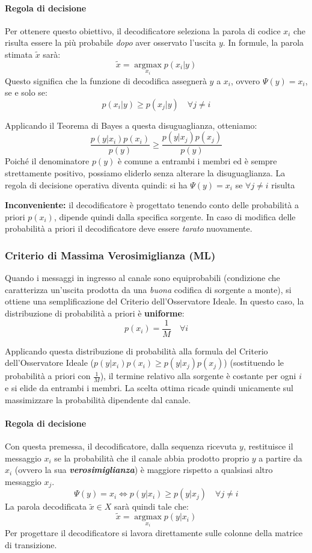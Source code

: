 \paragraph{Regola di decisione}
Per ottenere questo obiettivo, il decodificatore seleziona la parola di codice $x_i$ che risulta essere la più probabile \textit{dopo} aver osservato l'uscita $y$. In formule, la parola stimata $\tilde{x}$ sarà:
\[ \tilde{x} = \operatorname*{argmax}_{x_i} p(x_i|y)\]
Questo significa che la funzione di decodifica assegnerà $y$ a $x_i$, ovvero $\Psi(y)=x_i$, se e solo se:
\[ p(x_i|y) \geq p(x_j|y) \quad \forall j \neq i \]

Applicando il Teorema di Bayes a questa disuguaglianza, otteniamo:
\[ \frac{p(y|x_i)p(x_i)}{p(y)} \geq \frac{p(y|x_j)p(x_j)}{p(y)} \]
Poiché il denominatore $p(y)$ è comune a entrambi i membri ed è sempre strettamente positivo, possiamo eliderlo senza alterare la disuguaglianza. La regola di decisione operativa diventa quindi: 
si ha $\Psi(y)=x_i$ se $\forall j \neq i$ risulta




\vspace{0.2cm}
\noindent \colorbox{gray!15}{\textbf{Inconveniente:}} il decodificatore è progettato tenendo conto delle probabilità a priori $p(x_i)$, dipende quindi dalla specifica sorgente. In caso di modifica delle probabilità a priori il decodificatore deve essere \textit{tarato} nuovamente.

\subsubsection{Criterio di Massima Verosimiglianza (ML)}
Quando i messaggi in ingresso al canale sono equiprobabili (condizione che caratterizza un'uscita prodotta da una \textit{buona} codifica di sorgente a monte), si ottiene una semplificazione del Criterio dell'Osservatore Ideale. In questo caso, la distribuzione di probabilità a priori è \textbf{uniforme}:
\[ p(x_i) = \frac{1}{M} \quad \forall i \]

Applicando questa distribuzione di probabilità alla formula del Criterio dell'Osservatore Ideale ($p(y|x_i)p(x_i) \geq p(y|x_j)p(x_j)$) (sostituendo le probabilità a priori con $\frac{1}{M}$), il termine relativo alla sorgente è costante per ogni $i$ e si elide da entrambi i membri. La scelta ottima ricade quindi unicamente sul massimizzare la probabilità dipendente dal canale.

\paragraph{Regola di decisione}
Con questa premessa, il decodificatore, dalla sequenza ricevuta $y$, restituisce il messaggio $x_i$ se la probabilità che il canale abbia prodotto proprio $y$ a partire da $x_i$ (ovvero la sua \textbf{\textit{verosimiglianza}}) è maggiore rispetto a qualsiasi altro messaggio $x_j$.
\[ \Psi(y) = x_i \iff p(y|x_i) \geq p(y|x_j) \quad \forall j \neq i \]
La parola decodificata $\tilde{x} \in X$ sarà quindi tale che:
\[ \tilde{x} = \operatorname*{argmax}_{x_i} p(y|x_i)\]
Per progettare il decodificatore si lavora direttamente sulle colonne della matrice di transizione.


